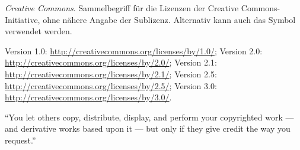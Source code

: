 \begin{description}
\setlength{\parskip}{0pt}
  \item[CC]
  \emph{Creative Commons}. Sammelbegriff für die Lizenzen der
  Creative Commons-Initiative, ohne nähere Angabe der Sublizenz. Alternativ kann auch das Symbol  verwendet werden.

  \item[CC-BY]
  \begin{inparadesc}
    \item[Lizenztext (Link):]
    Version 1.0: \url{http://creativecommons.org/licenses/by/1.0/};
    Version 2.0: \url{http://creativecommons.org/licenses/by/2.0/};
    Version 2.1: \url{http://creativecommons.org/licenses/by/2.1/};
    Version 2.5: \url{http://creativecommons.org/licenses/by/2.5/};
    Version 3.0: \url{http://creativecommons.org/licenses/by/3.0/}.
    \item[Kurzfassung (ohne Gewähr):] \enquote{You let others copy, distribute,
    display, and perform your copyrighted work — and derivative works based
    upon it — but only if they give credit the way you
    request.}
  \end{inparadesc}


\end{description}
